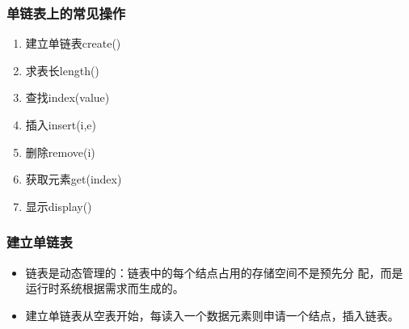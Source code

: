 \begin{frame}[fragile]
  \frametitle{单链表上的常见操作}
  \begin{enumerate}
  \item 建立单链表create()
  \item 求表长length()
  \item 查找index(value)
  \item 插入insert(i,e)
  \item 删除remove(i)
  \item 获取元素get(index)
  \item 显示display()
  \end{enumerate}
\end{frame}

\begin{frame}[fragile]
  \frametitle{建立单链表}
  \begin{itemize}
  \item 链表是{\color{red}动态管理}的：链表中的每个结点占用的存储空间不是预先分
    配，而是运行时系统根据需求而生成的。
  \item 建立单链表从空表开始，每读入一个数据元素则申请一个结点，插入链表。
  \end{itemize}
\end{frame}


